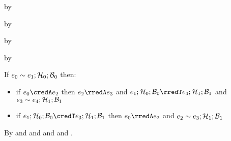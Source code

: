 \begin{lamportproof}
    \begin{pfproof}
      \qedstep
        \begin{pfproof}
          by \pfih
        \end{pfproof}
    \end{pfproof}

    \begin{pfproof}
      \qedstep
        \begin{pfproof}
          by \pfih
        \end{pfproof}
    \end{pfproof}

    \begin{pfproof}
      \qedstep
        \begin{pfproof}
          by \pfih
        \end{pfproof}
    \end{pfproof}

    \begin{pfproof}
      \qedstep
        \begin{pfproof}
          by \pfih
        \end{pfproof}
    \end{pfproof}

\end{lamportproof}

\begin{lemma}\label{AT-simulation}
  If\/ $e_0 \sim e_1; \mathcal{H}_0; \mathcal{B}_0$ then:
  \begin{itemize}
    \item
      if\/ $\sexpr_0 \credA \sexpr_2$
      then\/ $\sexpr_2 \rredA \sexpr_3$
      and\/ $\conf{\sexpr_1}{\vstore_0}{\bstore_0} \rredT \conf{\sexpr_4}{\vstore_1}{\bstore_1}$
      and\/ $e_3 \sim e_4; \mathcal{H}_1; \mathcal{B}_1$
    \item
      if\/ $\conf{\sexpr_1}{\vstore_0}{\bstore_0} \credT \conf{\sexpr_3}{\vstore_1}{\bstore_1}$
      then\/ $\sexpr_0 \rredA \sexpr_2$
      and\/ $e_2 \sim e_3; \mathcal{H}_1; \mathcal{B}_1$
  \end{itemize}
\end{lemma}
\begin{lamportproof}
  By  and  and  and  and .
\end{lamportproof}

